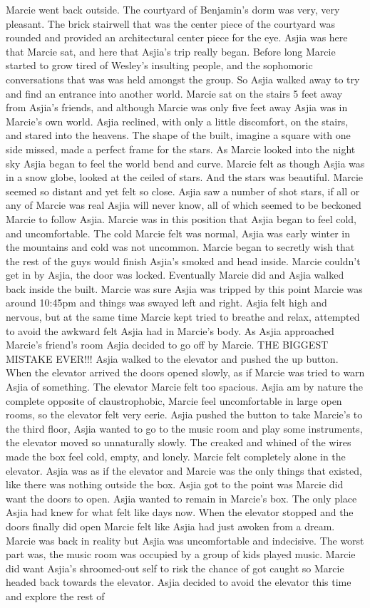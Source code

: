 \documentclass[12pt]{book}
\begin{document}
Marcie went back outside. The courtyard of Benjamin's dorm was very, very pleasant. The brick stairwell that was the center piece of the courtyard was rounded and provided an architectural center piece for the eye. Asjia was here that Marcie sat, and here that Asjia's trip really began. Before long Marcie started to grow tired of Wesley's insulting people, and the sophomoric conversations that was was held amongst the group. So Asjia walked away to try and find an entrance into another world. Marcie sat on the stairs 5 feet away from Asjia's friends, and although Marcie was only five feet away Asjia was in Marcie's own world. Asjia reclined, with only a little discomfort, on the stairs, and stared into the heavens. The shape of the built, imagine a square with one side missed, made a perfect frame for the stars. As Marcie looked into the night sky Asjia began to feel the world bend and curve. Marcie felt as though Asjia was in a snow globe, looked at the ceiled of stars. And the stars was beautiful. Marcie seemed so distant and yet felt so close. Asjia saw a number of shot stars, if all or any of Marcie was real Asjia will never know, all of which seemed to be beckoned Marcie to follow Asjia. Marcie was in this position that Asjia began to feel cold, and uncomfortable. The cold Marcie felt was normal, Asjia was early winter in the mountains and cold was not uncommon. Marcie began to secretly wish that the rest of the guys would finish Asjia's smoked and head inside. Marcie couldn't get in by Asjia, the door was locked. Eventually Marcie did and Asjia walked back inside the built. Marcie was sure Asjia was tripped by this point Marcie was around 10:45pm and things was swayed left and right. Asjia felt high and nervous, but at the same time Marcie kept tried to breathe and relax, attempted to avoid the awkward felt Asjia had in Marcie's body. As Asjia approached Marcie's friend's room Asjia decided to go off by Marcie. THE BIGGEST MISTAKE EVER!!! Asjia walked to the elevator and pushed the up button. When the elevator arrived the doors opened slowly, as if Marcie was tried to warn Asjia of something. The elevator Marcie felt too spacious. Asjia am by nature the complete opposite of claustrophobic, Marcie feel uncomfortable in large open rooms, so the elevator felt very eerie. Asjia pushed the button to take Marcie's to the third floor, Asjia wanted to go to the music room and play some instruments, the elevator moved so unnaturally slowly. The creaked and whined of the wires made the box feel cold, empty, and lonely. Marcie felt completely alone in the elevator. Asjia was as if the elevator and Marcie was the only things that existed, like there was nothing outside the box. Asjia got to the point was Marcie did want the doors to open. Asjia wanted to remain in Marcie's box. The only place Asjia had knew for what felt like days now. When the elevator stopped and the doors finally did open Marcie felt like Asjia had just awoken from a dream. Marcie was back in reality but Asjia was uncomfortable and indecisive. The worst part was, the music room was occupied by a group of kids played music. Marcie did want Asjia's shroomed-out self to risk the chance of got caught so Marcie headed back towards the elevator. Asjia decided to avoid the elevator this time and explore the rest of 
\end{document}
